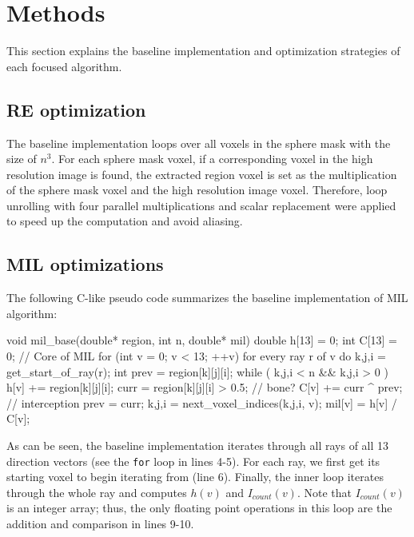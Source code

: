\documentclass[letterpaper]{article}
\begin{document}
\section{Methods}\label{sec:yourmethod}
This section explains the baseline implementation and optimization strategies of each focused algorithm.

\subsection{RE optimization} The baseline implementation loops over all voxels in the sphere mask with the size of $n^{3}$. For each sphere mask voxel, if a corresponding voxel in the high resolution image is found, the extracted region voxel is set as the multiplication of the sphere mask voxel and the high resolution image voxel. Therefore, loop unrolling with four parallel multiplications and scalar replacement were applied to speed up the computation and avoid aliasing. 

\subsection{MIL optimizations}
The following C-like pseudo code summarizes the baseline implementation of MIL algorithm:

\begin{ccode}[caption={My Caption},captionpos=b]
void mil_base(double* region, int n, double* mil){
  double h[13] = 0; int C[13] = 0;
  // Core of MIL
  for (int v = 0; v < 13; ++v)
    for every ray r of v  do
      {k,j,i} = get_start_of_ray(r);
      int prev = region[k][j][i];
      while ( {k,j,i} < n && {k,j,i} > 0 )
        h[v] += region[k][j][i];
        curr = region[k][j][i] > 0.5; // bone?
        C[v] += curr ^ prev; // interception
        prev = curr;
        {k,j,i} = next_voxel_indices({k,j,i}, v);
    mil[v] = h[v] / C[v];
 }
\end{ccode}
As can be seen, the baseline implementation iterates through all rays of all 13 direction vectors (see the \texttt{for} loop in lines 4-5). For each ray, we first get its starting voxel to begin iterating from (line 6). Finally, the inner loop iterates through the whole ray and computes $h(v)$ and $I_{count}(v)$. Note that $I_{count}(v)$ is an integer array; thus, the only floating point operations in this loop are the addition and comparison in lines 9-10.
\end{document}
